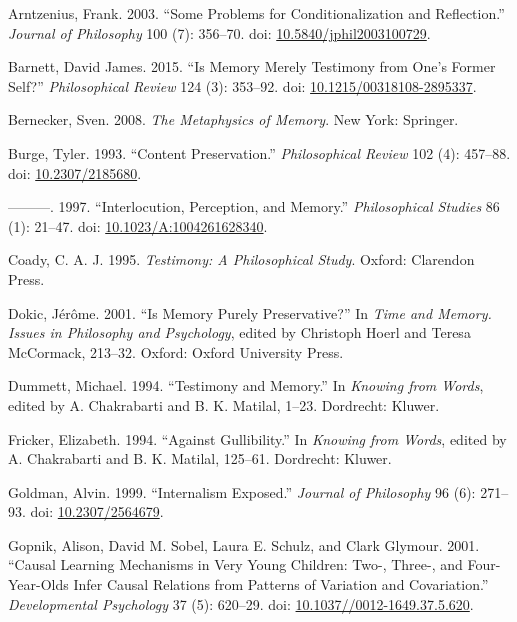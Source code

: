 \documentclass[
  11pt,
  letterpaper,
  DIV=11,
  numbers=noendperiod,
  twoside]{scrartcl}
\newlength{\cslhangindent}
\newenvironment{CSLReferences}[2] %
 {\begin{list}{}{%
  \setlength{\itemindent}{0pt}
  \setlength{\leftmargin}{0pt}
  \setlength{\parsep}{0pt}
  \ifodd #1
   \setlength{\leftmargin}{\cslhangindent}
   \setlength{\itemindent}{-1\cslhangindent}
  \fi
  \setlength{\itemsep}{#2\baselineskip}}}
 {\end{list}}
\begin{document}
\label{refs}
\begin{CSLReferences}{1}{0}
Arntzenius, Frank. 2003. {``Some Problems for Conditionalization and
Reflection.''} \emph{Journal of Philosophy} 100 (7): 356--70. doi:
\href{https://doi.org/10.5840/jphil2003100729}{10.5840/jphil2003100729}.

Barnett, David James. 2015. {``Is Memory Merely Testimony from One's
Former Self?''} \emph{Philosophical Review} 124 (3): 353--92. doi:
\href{https://doi.org/10.1215/00318108-2895337}{10.1215/00318108-2895337}.

Bernecker, Sven. 2008. \emph{The Metaphysics of Memory}. New York:
Springer.

Burge, Tyler. 1993. {``Content Preservation.''} \emph{Philosophical
Review} 102 (4): 457--88. doi:
\href{https://doi.org/10.2307/2185680}{10.2307/2185680}.

---------. 1997. {``Interlocution, Perception, and Memory.''}
\emph{Philosophical Studies} 86 (1): 21--47. doi:
\href{https://doi.org/10.1023/A:1004261628340}{10.1023/A:1004261628340}.

Coady, C. A. J. 1995. \emph{Testimony: A Philosophical Study}. Oxford:
Clarendon Press.

Dokic, Jérôme. 2001. {``Is Memory Purely Preservative?''} In \emph{Time
and Memory. Issues in Philosophy and Psychology}, edited by Christoph
Hoerl and Teresa McCormack, 213--32. Oxford: Oxford University Press.

Dummett, Michael. 1994. {``Testimony and Memory.''} In \emph{{K}nowing
from {W}ords}, edited by A. Chakrabarti and B. K. Matilal, 1--23.
Dordrecht: {K}luwer.

Fricker, Elizabeth. 1994. {``{A}gainst {G}ullibility.''} In
\emph{{K}nowing from {W}ords}, edited by A. Chakrabarti and B. K.
Matilal, 125--61. Dordrecht: {K}luwer.

Goldman, Alvin. 1999. {``Internalism Exposed.''} \emph{Journal of
Philosophy} 96 (6): 271--93. doi:
\href{https://doi.org/10.2307/2564679}{10.2307/2564679}.

Gopnik, Alison, David M. Sobel, Laura E. Schulz, and Clark Glymour.
2001. {``Causal Learning Mechanisms in Very Young Children: Two-,
Three-, and Four-Year-Olds Infer Causal Relations from Patterns of
Variation and Covariation.''} \emph{Developmental Psychology} 37 (5):
620--29. doi:
\href{https://doi.org/10.1037//0012-1649.37.5.620}{10.1037//0012-1649.37.5.620}.


\end{CSLReferences}
\end{document}

